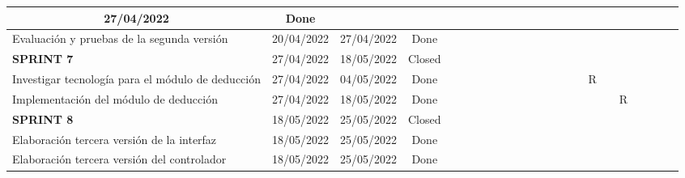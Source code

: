 \begin{landscape}
\begin{table}[h]
{\begin{tabular}{|lccc|l|l|l|l|l|l|l|l|l|l|l|l|l|l|l|l|l|l|l|}
  \multicolumn{1}{c|}{27/04/2022} &
  Done &
   &
   &
   &
   &
   &
   &
   &
   &
   &
   &
  \cellcolor[HTML]{07BB30} &
   &
   &
   &
   &
   &
   &
   &
   \\ \hline
\multicolumn{1}{|l|}{Evaluación y pruebas de la segunda versión} &
  \multicolumn{1}{c|}{20/04/2022} &
  \multicolumn{1}{c|}{27/04/2022} &
  Done &
   &
   &
   &
   &
   &
   &
   &
   &
   &
   &
  \cellcolor[HTML]{07BB30} &
   &
   &
   &
   &
   &
   &
   &
   \\ \hline
\multicolumn{1}{|l|}{\cellcolor[HTML]{C0C0C0}\textbf{SPRINT 7}} &
  \multicolumn{1}{c|}{\cellcolor[HTML]{C0C0C0}27/04/2022} &
  \multicolumn{1}{c|}{\cellcolor[HTML]{C0C0C0}18/05/2022} &
  \cellcolor[HTML]{C0C0C0}Closed &
   &
   &
   &
   &
   &
   &
   &
   &
   &
   &
   &
  \cellcolor[HTML]{A1E8A8} &
  \cellcolor[HTML]{A1E8A8} &
  \cellcolor[HTML]{A1E8A8} &
   &
   &
   &
   &
   \\ \hline
\multicolumn{1}{|l|}{Investigar tecnología para el módulo de deducción} &
  \multicolumn{1}{c|}{27/04/2022} &
  \multicolumn{1}{c|}{04/05/2022} &
  Done &
   &
   &
   &
   &
   &
   &
   &
   &
   &
   &
   &
  \cellcolor[HTML]{07BB30} &
  \multicolumn{1}{c|}{\cellcolor[HTML]{FFFFC7}R} &
   &
   &
   &
   &
   &
   \\ \hline
\multicolumn{1}{|l|}{Implementación del módulo de deducción} &
  \multicolumn{1}{c|}{27/04/2022} &
  \multicolumn{1}{c|}{18/05/2022} &
  Done &
   &
   &
   &
   &
   &
   &
   &
   &
   &
   &
   &
  \cellcolor[HTML]{07BB30} &
  \cellcolor[HTML]{07BB30} &
  \cellcolor[HTML]{07BB30} &
  \multicolumn{1}{c|}{\cellcolor[HTML]{FFFFC7}R} &
   &
   &
   &
   \\ \hline
\multicolumn{1}{|l|}{\cellcolor[HTML]{C0C0C0}\textbf{SPRINT 8}} &
  \multicolumn{1}{c|}{\cellcolor[HTML]{C0C0C0}18/05/2022} &
  \multicolumn{1}{c|}{\cellcolor[HTML]{C0C0C0}25/05/2022} &
  \cellcolor[HTML]{C0C0C0}Closed &
   &
   &
   &
   &
   &
   &
   &
   &
   &
   &
   &
   &
   &
   &
  \cellcolor[HTML]{A1E8A8} &
   &
   &
   &
   \\ \hline
\multicolumn{1}{|l|}{Elaboración tercera versión de la interfaz} &
  \multicolumn{1}{c|}{18/05/2022} &
  \multicolumn{1}{c|}{25/05/2022} &
  Done &
   &
   &
   &
   &
   &
   &
   &
   &
   &
   &
   &
   &
   &
   &
  \cellcolor[HTML]{07BB30} &
   &
   &
   &
   \\ \hline
\multicolumn{1}{|l|}{Elaboración tercera versión del controlador} &
  \multicolumn{1}{c|}{18/05/2022} &
  \multicolumn{1}{c|}{25/05/2022} &
  Done &
   &
   &
   &

\end{tabular}}
\end{table}
\end{landscape}
